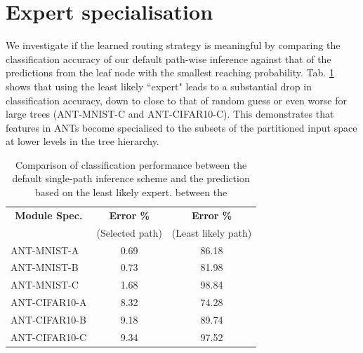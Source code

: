 \section{Expert specialisation}\label{sec:supp_expert_specialisation}
\vspace{-2mm}
We investigate if the learned routing strategy is meaningful by comparing the classification accuracy of our default path-wise inference against that of the predictions from the leaf node with the smallest reaching probability. Tab. \ref{tab:test_routers} shows that using the least likely ``expert" leads to a substantial drop in classification accuracy, down to close to that of random guess or even worse for large trees (ANT-MNIST-C and ANT-CIFAR10-C). This demonstrates that features in ANTs become specialised to the subsets of the partitioned input space at lower levels in the tree hierarchy. 

\begin{table}[h]
	\caption {Comparison of classification performance between the default single-path inference scheme and the prediction based on the least likely expert. \label{tab:test_routers} between the }
 	\vspace{-4mm}
    \footnotesize
    \center
	\begin{tabular}{|l|c|c|}
		\hline
		\multicolumn{1}{|c}{\textbf{Module Spec.}} &  \multicolumn{1}{|c|}{\textbf{Error \%}} & \multicolumn{1}{c|}{\textbf{Error \%}}  \\
		&(Selected path) & (Least likely path)  \\
		\hline
		ANT-MNIST-A &0.69 & 86.18  \\
	    ANT-MNIST-B &0.73 & 81.98  \\
        ANT-MNIST-C &1.68 & 98.84  \\
		ANT-CIFAR10-A & 8.32 & 74.28  \\
        ANT-CIFAR10-B & 9.18 & 89.74  \\
        ANT-CIFAR10-C & 9.34 & 97.52  \\
		\hline
	\end{tabular}
\end{table}
\vspace{-4mm}
